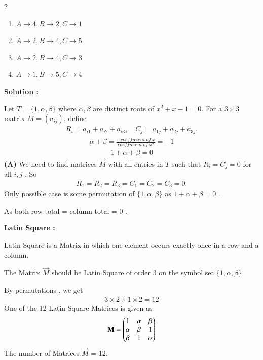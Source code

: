 \documentclass[journal]{IEEEtran}
\begin{document}
\begin{multicols}{2}
\begin{enumerate}
\item $A \to 4, B \to 2, C \to 1$ 
\item $A \to 2, B \to 4, C \to 5$
\item $A \to 2, B \to 4, C \to 3$ 
\item $A \to 1, B \to 5, C \to 4$
\end{enumerate}
\end{multicols}

\textbf{Solution :}

Let $T = \{1,\alpha,\beta\}$ where $\alpha,\beta$ are distinct roots of $x^2+x-1=0$.  
For a $3 \times 3$ matrix $M = (a_{ij})$, define
\begin{align}
R_i = a_{i1} + a_{i2} + a_{i3}, 
\quad 
C_j = a_{1j} + a_{2j} + a_{3j}.
\end{align}
\begin{align}
\alpha+\beta = \frac{-coefficient \ of \ x}{coefficient \ of \ x^2} = -1
\end{align}
\begin{align}
1+\alpha+\beta = 0
\end{align}
\textbf{(A)} We need to find matrices $\vec{M}$ with all entries in $T$ such that $R_i=C_j=0$ for all $i,j$ ,
So
\begin{align}
R_1 = R_2 = R_3 = C_1 = C_2 = C_3 = 0.
\end{align}
Only possible case is some permutation of $\{1,\alpha,\beta\}$ as $1 + \alpha + \beta = 0$ .

As both row total = column total = 0 .

\textbf{Latin Square :}

Latin Square is a Matrix in which one element occurs exactly once in a row and a column.

The Matrix $\vec{M}$ should be Latin Square of order 3 on the symbol set $\{1,\alpha,\beta\}$ 

By permutations , we get
\begin{align}
3\times2\times1\times2 = 12
\end{align}
One of the 12 Latin Square Matrices is given as 
\begin{align}
\mathbf{M} = \begin{pmatrix}1 & \alpha & \beta \\
       \alpha & \beta & 1 \\
       \beta & 1 & \alpha\end{pmatrix}
\end{align}
The number of Matrices $\vec{M}$ = 12.
\end{document}
